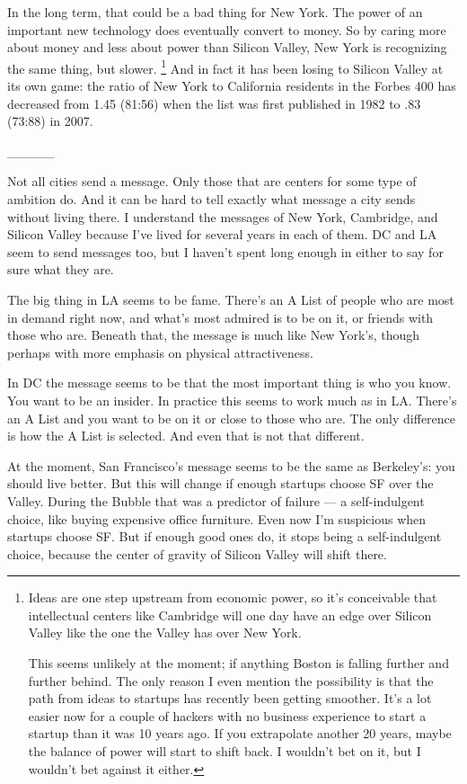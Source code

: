In the long term, that could be a bad thing for New York. The power of
an important new technology does eventually convert to money. So by
caring more about money and less about power than Silicon Valley, New
York is recognizing the same thing, but slower. \footnote{Ideas are one step upstream from economic power, so it's
conceivable that intellectual centers like Cambridge will one day have
an edge over Silicon Valley like the one the Valley has over New York.

This seems unlikely at the moment; if anything Boston is falling further
and further behind. The only reason I even mention the possibility is
that the path from ideas to startups has recently been getting smoother.
It's a lot easier now for a couple of hackers with no business
experience to start a startup than it was 10 years ago. If you
extrapolate another 20 years, maybe the balance of power will start to
shift back. I wouldn't bet on it, but I wouldn't bet against it either.}
And in fact it has been losing to Silicon Valley at its own game: the
ratio of New York to California residents in the Forbes 400 has
decreased from 1.45 (81:56) when the list was first published in 1982 to
.83 (73:88) in 2007.

\_\_\_\_\_

Not all cities send a message. Only those that are centers for some type
of ambition do. And it can be hard to tell exactly what message a city
sends without living there. I understand the messages of New York,
Cambridge, and Silicon Valley because I've lived for several years in
each of them. DC and LA seem to send messages too, but I haven't spent
long enough in either to say for sure what they are.

The big thing in LA seems to be fame. There's an A List of people who
are most in demand right now, and what's most admired is to be on it, or
friends with those who are. Beneath that, the message is much like New
York's, though perhaps with more emphasis on physical attractiveness.

In DC the message seems to be that the most important thing is who you
know. You want to be an insider. In practice this seems to work much as
in LA. There's an A List and you want to be on it or close to those who
are. The only difference is how the A List is selected. And even that is
not that different.

At the moment, San Francisco's message seems to be the same as
Berkeley's: you should live better. But this will change if enough
startups choose SF over the Valley. During the Bubble that was a
predictor of failure --- a self-indulgent choice, like buying expensive
office furniture. Even now I'm suspicious when startups choose SF. But
if enough good ones do, it stops being a self-indulgent choice, because
the center of gravity of Silicon Valley will shift there.

